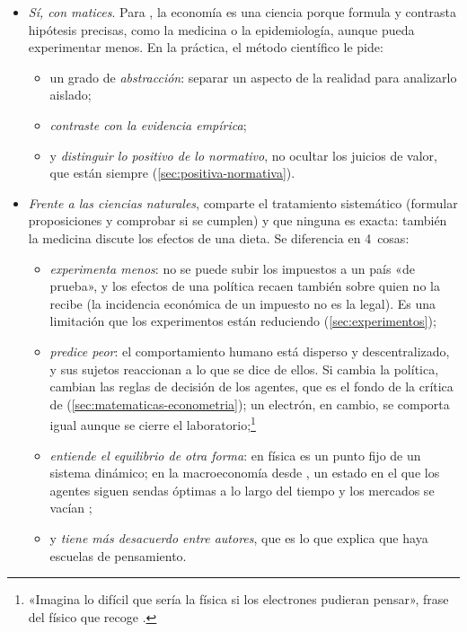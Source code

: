 \documentclass[11pt]{article}
\begin{document}
\begin{itemize}
\item \emph{Sí, con matices}. Para \textcite{Chetty2013Science}, la economía es una ciencia porque formula y contrasta hipótesis precisas, como la medicina o la epidemiología, aunque pueda experimentar menos. En la práctica, el método científico le pide:
  \begin{itemize}
  \item un grado de \emph{abstracción}: separar un aspecto de la realidad para analizarlo aislado;
  \item \emph{contraste con la evidencia empírica};
  \item y \emph{distinguir lo positivo de lo normativo}, no ocultar los juicios de valor, que están siempre (\ref{sec:positiva-normativa}).
  \end{itemize}
\item \emph{Frente a las ciencias naturales}, comparte el tratamiento sistemático (formular proposiciones y comprobar si se cumplen) y que ninguna es exacta: también la medicina discute los efectos de una dieta. Se diferencia en 4~cosas:
  \begin{itemize}
  \item \emph{experimenta menos}: no se puede subir los impuestos a un país «de prueba», y los efectos de una política recaen también sobre quien no la recibe (la incidencia económica de un impuesto no es la legal). Es una limitación que los experimentos están reduciendo (\ref{sec:experimentos});
  \item \emph{predice peor}: el comportamiento humano está disperso y descentralizado, y sus sujetos reaccionan a lo que se dice de ellos. Si cambia la política, cambian las reglas de decisión de los agentes, que es el fondo de la crítica de  (\ref{sec:matematicas-econometria}); un electrón, en cambio, se comporta igual aunque se cierre el laboratorio;\footnote{«Imagina lo difícil que sería la física si los electrones pudieran pensar», frase del físico  que recoge \textcite{Page1999Computational}.}
  \item \emph{entiende el equilibrio de otra forma}: en física es un punto fijo de un sistema dinámico; en la macroeconomía desde , un estado en el que los agentes siguen sendas óptimas a lo largo del tiempo y los mercados se vacían ;
  \item y \emph{tiene más desacuerdo entre autores}, que es lo que explica que haya escuelas de pensamiento.
  \end{itemize}

\end{itemize}
\end{document}
